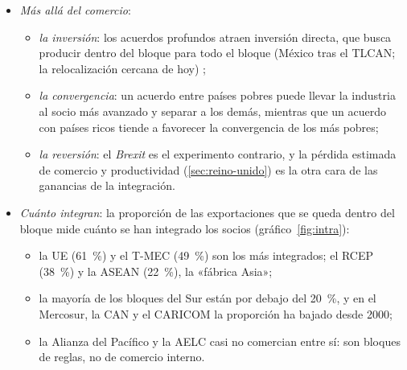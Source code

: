 \documentclass[11pt]{article}
\begin{document}
\begin{itemize}
\begin{itemize}
  \item \emph{Los megaacuerdos de Asia-Pacífico}: según las simulaciones de \textcite{PetriPlummer2020}, en 2030 el RCEP elevará la renta mundial en unos 186.000~millones de dólares al año y el CPTPP en unos 147.000~millones; el RCEP aumentará el comercio entre sus miembros en unos 428.000~millones y reducirá el comercio con terceros en unos 48.000~millones: la creación supera con mucho a la desviación.
  \item \emph{La ZLECAf}: el Banco Mundial estima que, aplicada por completo, elevará la renta de África un 7~\% en 2035 (unos 450.000~millones de dólares), y que casi 2~tercios de esa ganancia vendrán de la facilitación del comercio y no de las rebajas de aranceles\nocite{BM2020ZLECAf}.
  \end{itemize}
\item \emph{Más allá del comercio}:
  \begin{itemize}
  \item \emph{la inversión}: los acuerdos profundos atraen inversión directa, que busca producir dentro del bloque para todo el bloque (México tras el TLCAN; la relocalización cercana de hoy) ;
  \item \emph{la convergencia}: un acuerdo entre países pobres puede llevar la industria al socio más avanzado y separar a los demás, mientras que un acuerdo con países ricos tiende a favorecer la convergencia de los más pobres\nocite{Venables2003};
  \item \emph{la reversión}: el \emph{Brexit} es el experimento contrario, y la pérdida estimada de comercio y productividad (\ref{sec:reino-unido}) es la otra cara de las ganancias de la integración.
  \end{itemize}
\item \emph{Cuánto integran}: la proporción de las exportaciones que se queda dentro del bloque mide cuánto se han integrado los socios (gráfico~\ref{fig:intra}):
  \begin{itemize}
  \item la UE (61~\%) y el T-MEC (49~\%) son los más integrados; el RCEP (38~\%) y la ASEAN (22~\%), la «fábrica Asia»;
  \item la mayoría de los bloques del Sur están por debajo del 20~\%, y en el Mercosur, la CAN y el CARICOM la proporción ha bajado desde 2000;
  \item la Alianza del Pacífico y la AELC casi no comercian entre sí: son bloques de reglas, no de comercio interno.
  \end{itemize}
\end{itemize}
\end{document}
